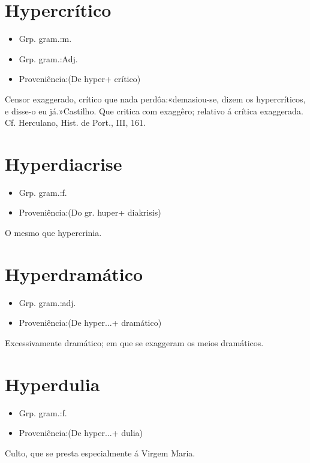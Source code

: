 \documentclass{article}
\begin{document}
\section{Hypercrítico}
\begin{itemize}
\item {Grp. gram.:m.}
\end{itemize}
\begin{itemize}
\item {Grp. gram.:Adj.}
\end{itemize}
\begin{itemize}
\item {Proveniência:(De \textunderscore hyper\textunderscore  + \textunderscore crítico\textunderscore )}
\end{itemize}
Censor exaggerado, crítico que nada perdôa:«\textunderscore demasiou-se, dizem os hypercríticos, e disse-o eu já.\textunderscore »Castilho.
Que critica com exaggêro; relativo á crítica exaggerada. Cf. Herculano, \textunderscore Hist. de Port.\textunderscore , III, 161.
\section{Hyperdiacrise}
\begin{itemize}
\item {Grp. gram.:f.}
\end{itemize}
\begin{itemize}
\item {Proveniência:(Do gr. \textunderscore huper\textunderscore  + \textunderscore diakrisis\textunderscore )}
\end{itemize}
O mesmo que \textunderscore hypercrinia\textunderscore .
\section{Hyperdramático}
\begin{itemize}
\item {Grp. gram.:adj.}
\end{itemize}
\begin{itemize}
\item {Proveniência:(De \textunderscore hyper...\textunderscore  + \textunderscore dramático\textunderscore )}
\end{itemize}
Excessivamente dramático; em que se exaggeram os meios dramáticos.
\section{Hyperdulia}
\begin{itemize}
\item {Grp. gram.:f.}
\end{itemize}
\begin{itemize}
\item {Proveniência:(De \textunderscore hyper...\textunderscore  + \textunderscore dulia\textunderscore )}
\end{itemize}
Culto, que se presta especialmente á Virgem Maria.
\end{document}
